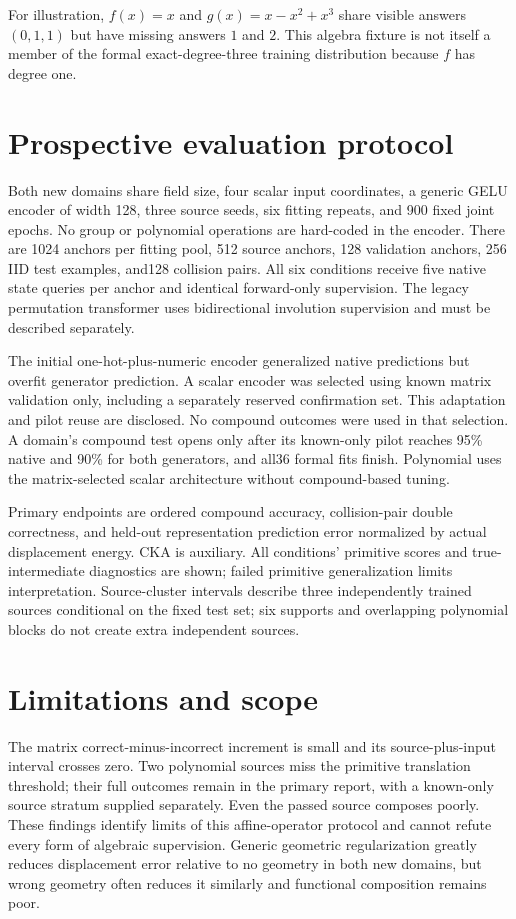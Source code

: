 \documentclass[11pt]{article}
\begin{document}
For illustration, $f(x)=x$ and $g(x)=x-x^2+x^3$ share visible answers $(0,1,1)$ but have missing answers $1$ and $2$. This algebra fixture is not itself a member of the formal exact-degree-three training distribution because $f$ has degree one.

\section{Prospective evaluation protocol}
Both new domains share field size, four scalar input coordinates, a generic GELU encoder of width 128, three source seeds, six fitting repeats, and 900 fixed joint epochs. No group or polynomial operations are hard-coded in the encoder. There are 1024 anchors per fitting pool, 512 source anchors, 128 validation anchors, 256 IID test examples, and128 collision pairs. All six conditions receive five native state queries per anchor and identical forward-only supervision. The legacy permutation transformer uses bidirectional involution supervision and must be described separately.

The initial one-hot-plus-numeric encoder generalized native predictions but overfit generator prediction. A scalar encoder was selected using known matrix validation only, including a separately reserved confirmation set. This adaptation and pilot reuse are disclosed. No compound outcomes were used in that selection. A domain's compound test opens only after its known-only pilot reaches 95\% native and 90\% for both generators, and all36 formal fits finish. Polynomial uses the matrix-selected scalar architecture without compound-based tuning.

Primary endpoints are ordered compound accuracy, collision-pair double correctness, and held-out representation prediction error normalized by actual displacement energy. CKA is auxiliary. All conditions' primitive scores and true-intermediate diagnostics are shown; failed primitive generalization limits interpretation. Source-cluster intervals describe three independently trained sources conditional on the fixed test set; six supports and overlapping polynomial blocks do not create extra independent sources.



\section{Limitations and scope}
The matrix correct-minus-incorrect increment is small and its source-plus-input interval crosses zero. Two polynomial sources miss the primitive translation threshold; their full outcomes remain in the primary report, with a known-only source stratum supplied separately. Even the passed source composes poorly. These findings identify limits of this affine-operator protocol and cannot refute every form of algebraic supervision. Generic geometric regularization greatly reduces displacement error relative to no geometry in both new domains, but wrong geometry often reduces it similarly and functional composition remains poor.
\end{document}
